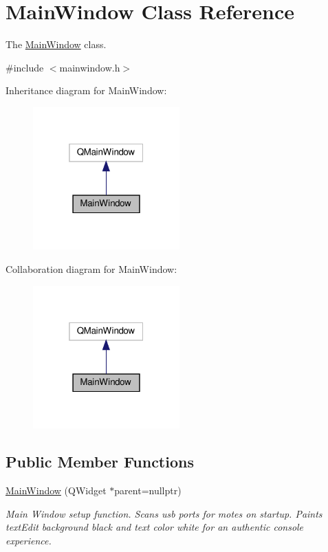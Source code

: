 \hypertarget{classMainWindow}{}\section{Main\+Window Class Reference}
\label{classMainWindow}


The \hyperlink{classMainWindow}{Main\+Window} class.  




{\ttfamily \#include $<$mainwindow.\+h$>$}



Inheritance diagram for Main\+Window\+:\nopagebreak
\begin{figure}[H]
\begin{center}
\leavevmode
\includegraphics[width=160pt]{classMainWindow__inherit__graph}
\end{center}
\end{figure}


Collaboration diagram for Main\+Window\+:\nopagebreak
\begin{figure}[H]
\begin{center}
\leavevmode
\includegraphics[width=160pt]{classMainWindow__coll__graph}
\end{center}
\end{figure}
\subsection*{Public Member Functions}
\begin{DoxyCompactItemize}
\item 
\mbox{\label{classMainWindow_a996c5a2b6f77944776856f08ec30858d}} 
\hyperlink{classMainWindow_a996c5a2b6f77944776856f08ec30858d}{Main\+Window} (Q\+Widget $\ast$parent=nullptr)
\begin{DoxyCompactList}\small\item\em Main Window setup function. Scans usb ports for motes on startup. Paints text\+Edit background black and text color white for an authentic console experience. \end{DoxyCompactList}\end{DoxyCompactItemize}

